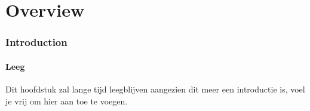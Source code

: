 
\part{Overview}
\section{Introduction}

\subsection{Leeg}
Dit hoofdstuk zal lange tijd leegblijven aangezien dit meer een introductie is, voel je vrij om hier aan toe te voegen.

